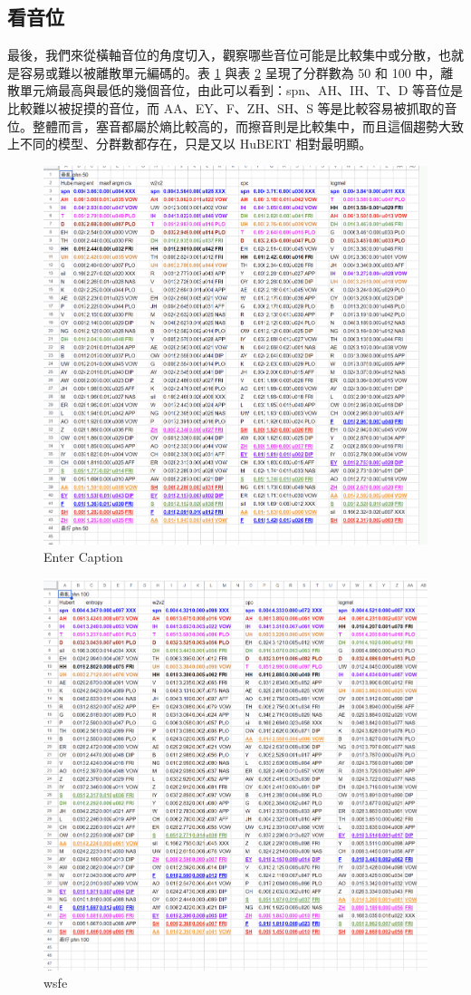 \subsection{看音位}

{
}




        最後，我們來從橫軸音位的角度切入，觀察哪些音位可能是比較集中或分散，也就是容易或難以被離散單元編碼的。表  \ref{fig:entefffffr-label} 與表 \ref{ewfeef} 呈現了分群數為 50 和 100 中，離散單元熵最高與最低的幾個音位，由此可以看到：spn、AH、IH、T、D 等音位是比較難以被捉摸的音位，而 AA、EY、F、ZH、SH、S 等是比較容易被抓取的音位。整體而言，塞音都屬於熵比較高的，而擦音則是比較集中，而且這個趨勢大致上不同的模型、分群數都存在，只是又以 HuBERT 相對最明顯。

\begin{figure}
    \centering
    \includegraphics[width=0.5\linewidth]{figures/aaaaaaaaaaaaaa.png}
    \caption{Enter Caption}
    \label{fig:entefffffr-label}
\end{figure}

\begin{figure}
    \centering
    \includegraphics[width=0.5\linewidth]{figures/asdfasdfsfasfaew.png}
    \caption{wsfe}
    \label{ewfeef}
\end{figure}

